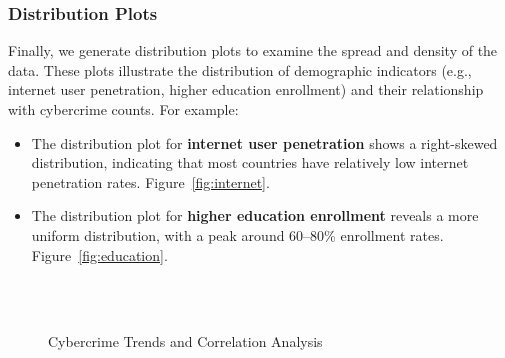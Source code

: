     \subsubsection{Distribution Plots} %
        Finally, we generate distribution plots to examine the spread and density of the data.
        These plots illustrate the distribution of demographic indicators
        (e.g., internet user penetration, higher education enrollment) and their relationship with cybercrime counts.
        For example:
        \begin{itemize}
            \item The distribution plot for \textbf{internet user penetration} shows a right-skewed distribution,
                indicating that most countries have relatively low internet penetration rates.
                Figure~\ref{fig:internet}.
            \item The distribution plot for \textbf{higher education enrollment} reveals a more uniform distribution,
                with a peak around 60--80\% enrollment rates.
                Figure~\ref{fig:education}.
        \end{itemize}
        \begin{figure}[htb]
            \centering
            \\
            \\
            \caption{Cybercrime Trends and Correlation Analysis}
        \end{figure}

